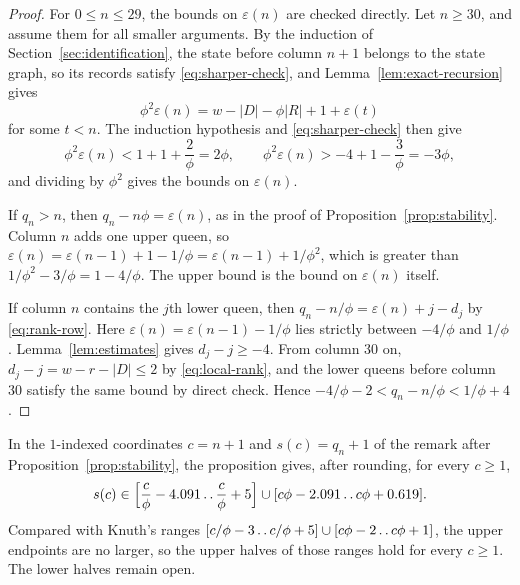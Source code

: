 \begin{proof}
For $0\le n\le29$, the bounds on $\varepsilon(n)$ are checked
directly. Let $n\ge30$, and assume them for all smaller arguments. By
the induction of Section~\ref{sec:identification}, the state before
column $n+1$ belongs to the state graph, so its records satisfy
\eqref{eq:sharper-check}, and Lemma~\ref{lem:exact-recursion} gives
\[
 \phi^2\varepsilon(n)=w-|D|-\phi|R|+1+\varepsilon(t)
\]
for some $t<n$. The induction hypothesis and \eqref{eq:sharper-check}
then give
\[
 \phi^2\varepsilon(n)<1+1+\frac{2}{\phi}=2\phi,\qquad
 \phi^2\varepsilon(n)>-4+1-\frac{3}{\phi}=-3\phi,
\]
and dividing by $\phi^2$ gives the bounds on $\varepsilon(n)$.

If $q_n>n$, then $q_n-n\phi=\varepsilon(n)$, as in the proof of
Proposition~\ref{prop:stability}. Column $n$ adds one upper queen, so
$\varepsilon(n)=\varepsilon(n-1)+1-1/\phi=\varepsilon(n-1)+1/\phi^2$,
which is greater than $1/\phi^2-3/\phi=1-4/\phi$. The upper bound is
the bound on $\varepsilon(n)$ itself.

If column $n$ contains the $j$th lower queen, then
$q_n-n/\phi=\varepsilon(n)+j-d_j$ by \eqref{eq:rank-row}. Here
$\varepsilon(n)=\varepsilon(n-1)-1/\phi$ lies strictly between
$-4/\phi$ and $1/\phi$. Lemma~\ref{lem:estimates} gives $d_j-j\ge-4$.
From column $30$ on, $d_j-j=w-r-|D|\le2$ by \eqref{eq:local-rank},
and the lower queens before column $30$ satisfy the same bound by
direct check. Hence $-4/\phi-2<q_n-n/\phi<1/\phi+4$.
\end{proof}

In the $1$-indexed coordinates $c=n+1$ and $s(c)=q_n+1$ of the remark
after Proposition~\ref{prop:stability}, the proposition gives, after
rounding, for every $c\ge1$,
\[
 s(c)\in
 \Bigl[\frac{c}{\phi}-4.091\mathinner{\ldotp\ldotp}\frac{c}{\phi}+5\Bigr]
 \cup[c\phi-2.091\mathinner{\ldotp\ldotp} c\phi+0.619].
\]
Compared with Knuth's ranges
$[c/\phi-3\mathinner{\ldotp\ldotp} c/\phi+5]\cup[c\phi-2\mathinner{\ldotp\ldotp} c\phi+1]$, the upper endpoints
are no larger, so the upper halves of those ranges hold for every
$c\ge1$. The lower halves remain open.
